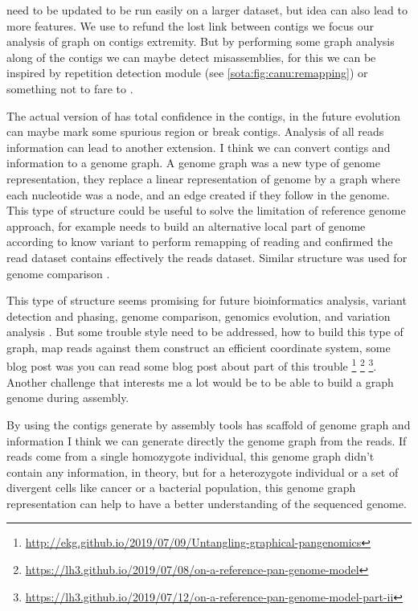 \documentclass[main.tex]{subfiles}
\begin{document}
\knot need to be updated to be run easily on a larger dataset, but \knot idea can also lead to more features. We use \knot \OLC to refund the lost link between contigs we focus our analysis of graph on contigs extremity. But by performing some graph analysis along of the contigs we can maybe detect misassemblies, for this we can be inspired by \canu repetition detection module (see \ref{sota:fig:canu:remapping}) or something not to fare to \cite{jackman2018tigmint}.

The actual version of \knot has total confidence in the contigs, in the future evolution can maybe mark some spurious region or break contigs. Analysis of all reads information can lead to another extension. I think we can convert contigs and \knot \OLC information to a genome graph. A genome graph was a new type of genome representation, they replace a linear representation of genome by a graph where each nucleotide was a node, and an edge created if they follow in the genome. This type of structure could be useful to solve the limitation of reference genome approach, for example  \cite{whatshap} needs to build an alternative local part of genome according to know variant to perform remapping of reading and confirmed the read dataset contains effectively the reads dataset. Similar structure was used for genome comparison  \cite{cactus_graph}.

This type of structure seems promising for future bioinformatics analysis, variant detection and phasing, genome comparison,  genomics evolution, and variation analysis \cite{goodbye_ref_hello_graphs}. But some trouble style need to be addressed, how to build this type of graph, map reads against them construct an efficient coordinate system, some blog post was you can read some blog post about part of this trouble \footnote{\url{http://ekg.github.io/2019/07/09/Untangling-graphical-pangenomics}} \footnote{\url{https://lh3.github.io/2019/07/08/on-a-reference-pan-genome-model}} \footnote{\url{https://lh3.github.io/2019/07/12/on-a-reference-pan-genome-model-part-ii}}. Another challenge that interests me a lot would be to be able to build a graph genome during assembly.

By using the contigs generate by assembly tools has scaffold of genome graph and \knot \OLC information I think we can generate directly the genome graph from the reads. If reads come from a single homozygote individual, this genome graph didn't contain any information, in theory, but for a heterozygote individual or a set of divergent cells like cancer or a bacterial population, this genome graph representation can help to have a better understanding of the sequenced genome.

\end{document}
